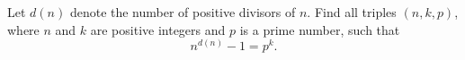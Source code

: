 Let $d(n)$ denote the number of positive divisors of $n$.  Find all triples $(n,k,p)$,  where $n$ and $k$ are positive integers and $p$ is a prime number, such that\[n^{d(n)} - 1 = p^k.\]